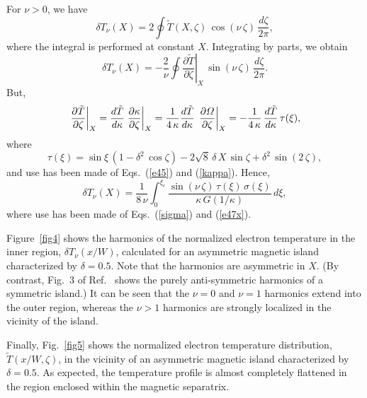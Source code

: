 \documentclass[12pt,prb,aps]{revtex4-1}
\begin{document}
For $\nu>0$, we have
\begin{equation}
\delta T_\nu(X) = 2\oint\tilde{T}(X,\zeta)\,\cos(\nu\,\zeta)\,\frac{d\zeta}{2\pi},
\end{equation}
where the integral is performed at constant $X$. 
Integrating by parts, we obtain
\begin{equation}
\delta T_\nu(X) = -\frac{2}{\nu}\oint\left.\frac{\partial \tilde{T}}{\partial\zeta}\right|_X\,\sin(\nu\,\zeta)\,\frac{d\zeta}{2\pi}.
\end{equation}
But,
\begin{equation}
\left.\frac{\partial \tilde{T}}{\partial\zeta}\right|_X=\frac{d\tilde{T}}{d\kappa}\left.\frac{\partial \kappa}{\partial\zeta}\right|_{X}
=\frac{1}{4\,\kappa}\frac{d\tilde{T}}{d\kappa}\,\left.\frac{\partial {\mit\Omega}}{\partial\zeta}\right|_{X}=-\frac{1}{4\,\kappa}\,\frac{d\tilde{T}}{d\kappa}\,\tau(\xi),
\end{equation}
where
\begin{equation}
\tau(\xi) = \sin\xi\,(1-\delta^2\,\cos\zeta)  -2\sqrt{8}\,\delta\,X\,\sin\zeta +\delta^2\,\sin(2\,\zeta),
\end{equation}
and use has been made of Eqs.~(\ref{e45}) and (\ref{kappa}). 
Hence,
\begin{equation}
\delta T_\nu(X) =\frac{1}{8\,\nu}\int_0^{\xi_c}\frac{\sin(\nu\,\zeta)\,\tau(\xi)\,\sigma(\xi)}{\kappa\,G(1/\kappa)}\,d\xi,
\end{equation}
where use has been made of Eqs.~(\ref{sigma}) and (\ref{e47x}).

Figure~\ref{fig4} shows the harmonics of the normalized electron temperature  in the inner region, $\delta T_\nu(x/W)$, calculated for an asymmetric
magnetic island characterized by $\delta=0.5$.  Note that the harmonics are asymmetric in $X$. (By contrast, Fig.~3 of Ref.~ shows
the purely anti-symmetric harmonics of a symmetric island.) It can be seen that the $\nu=0$ and $\nu=1$ harmonics extend into the outer region, whereas the
$\nu>1$ harmonics are strongly localized in the vicinity of the island. 

Finally, Fig.~\ref{fig5} shows the normalized electron temperature distribution, $\tilde{T}(x/W,\zeta)$, in the vicinity of an asymmetric magnetic island  characterized by
$\delta = 0.5$. As expected, the temperature profile is almost completely flattened in the region enclosed  within the magnetic separatrix. 
\end{document}
